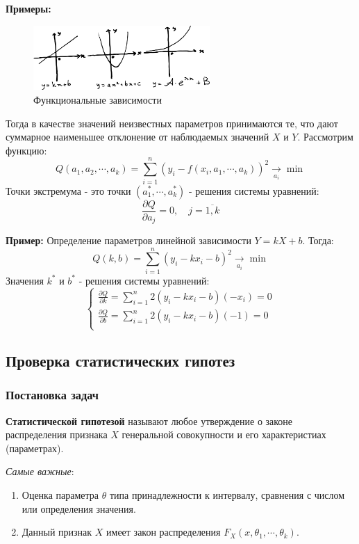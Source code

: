 \documentclass[12pt, a4paper]{article}
\begin{document}
\textbf{Примеры:}
\begin{figure}[h]
 \centering
 \includegraphics[width=0.6\textwidth]{05}
 \vspace{-4mm}
  \caption{Функциональные зависимости}
\end{figure}

Тогда в качестве значений неизвестных параметров принимаются те, что дают суммарное наименьшее отклонение от наблюдаемых значений $X$ и $Y$. Рассмотрим функцию:
\[Q(a_1, a_2, \cdots, a_k) = \sum_{i=1}^n (y_i - f(x_i, a_1, \cdots, a_k))^2 \xrightarrow[a_i]{} \min \]
Точки экстремума - это точки $(a_1^*, \cdots, a_k^*)$ - решения системы уравнений:
\[\frac{\partial Q}{\partial a_j} = 0, \quad j=\overline{1,k} \]

\textbf{Пример:} Определение параметров линейной зависимости $Y = kX + b$. Тогда:
\[Q(k, b) = \sum_{i=1}^n (y_i - kx_i - b)^2 \xrightarrow[a_i]{} \min \]
Значения $k^*$ и $b^*$ - решения системы уравнений:
\[\begin{cases}
\frac{\partial Q}{\partial k} = \sum_{i=1}^n 2(y_i - kx_i - b)(-x_i) = 0 \\
\frac{\partial Q}{\partial b} = \sum_{i=1}^n 2(y_i - kx_i - b)(-1) = 0 \\
\end{cases} \]

\subsection{Проверка статистических гипотез}

\subsubsection{Постановка задач}

\textbf{Статистической гипотезой} называют любое утверждение о законе распределения признака $X$ генеральной совокупности и его характеристиах (параметрах).

\textit{Самые важные}:
\begin{enumerate}
 \item Оценка параметра $\theta$ типа принадлежности к интервалу, сравнения с числом или определения значения.
 \item Данный признак $X$ имеет закон распределения $F_X(x, \theta_1, \cdots, \theta_k)$.
\end{enumerate}
\end{document}
